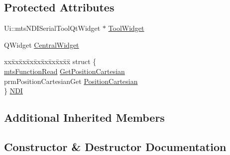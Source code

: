 \subsection*{Protected Attributes}
\begin{DoxyCompactItemize}
\item 
Ui\+::mts\+N\+D\+I\+Serial\+Tool\+Qt\+Widget $\ast$ \hyperlink{classmts_n_d_i_serial_tool_qt_component_af967ad37bf503470a35cb6fd9b6bd247}{Tool\+Widget}
\item 
Q\+Widget \hyperlink{classmts_n_d_i_serial_tool_qt_component_ae0c40b10c41b0859fd974923538e77aa}{Central\+Widget}
\item 
\begin{tabbing}
xx\=xx\=xx\=xx\=xx\=xx\=xx\=xx\=xx\=\kill
struct \{\\
\>\hyperlink{classmts_function_read}{mtsFunctionRead} \hyperlink{classmts_n_d_i_serial_tool_qt_component_a71bcb12553a365aadbb331892c63c734}{GetPositionCartesian}\\
\>prmPositionCartesianGet \hyperlink{classmts_n_d_i_serial_tool_qt_component_aeeeb01caede4ad7c1b9861e6b5325941}{PositionCartesian}\\
\} \hyperlink{classmts_n_d_i_serial_tool_qt_component_ad73d0d491f1f7da8040c36af309356cf}{NDI}\\

\end{tabbing}\end{DoxyCompactItemize}
\subsection*{Additional Inherited Members}


\subsection{Constructor \& Destructor Documentation}
\hypertarget{classmts_n_d_i_serial_tool_qt_component_a936a395717f665487020236f9937fe89}{}
